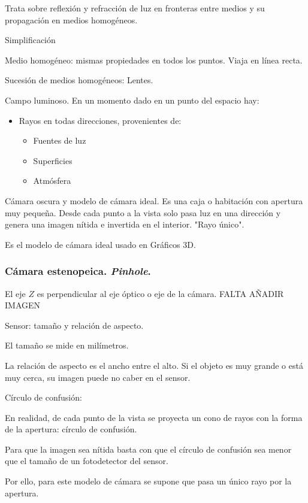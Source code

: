 \documentclass[a4paper]{book}
\begin{document}
Trata sobre reflexión y refracción de luz en fronteras entre medios y su propagación en medios homogéneos.

Simplificación

Medio homogéneo: mismas propiedades en todos los puntos. Viaja en línea recta.

Sucesión de medios homogéneos: Lentes.

Campo luminoso. En un momento dado en un punto del espacio hay:
\begin{itemize}
	\item Rayos en todas direcciones, provenientes de:
	      \begin{itemize}
		      \item Fuentes de luz
		      \item Superficies
		      \item Atmósfera
	      \end{itemize}
\end{itemize}

Cámara oscura y modelo de cámara ideal. Es una caja o habitación con apertura muy pequeña. Desde cada punto a la vista solo pasa luz en una dirección y genera una imagen nítida e invertida en el interior. "Rayo único".

Es el modelo de cámara ideal usado en Gráficos 3D.



\subsubsection{Cámara estenopeica. \textit{Pinhole}.}

El eje $Z$ es perpendicular al eje óptico o eje de la cámara. FALTA AÑADIR IMAGEN

Sensor: tamaño y relación de aspecto.

El tamaño se mide en milímetros.

La relación de aspecto es el ancho entre el alto. Si el objeto es muy grande o está muy cerca, su imagen puede no caber en el sensor.

Círculo de confusión:

En realidad, de cada punto de la vista se proyecta un cono de rayos con la forma de la apertura: círculo de confusión.

Para que la imagen sea nítida basta con que el círculo de confusión sea menor que el tamaño de un fotodetector del sensor.

Por ello, para este modelo de cámara se supone que pasa un único rayo por la apertura.
\end{document}
